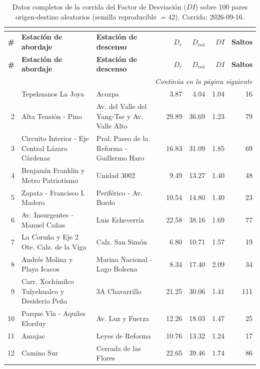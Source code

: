 {\scriptsize
\begin{longtable}{|r|p{5.0cm}|p{5.0cm}|r|r|r|r|}
\caption[Datos de corrida: Factor de Desviación (n=100, semilla=42)]{%
Datos completos de la corrida del Factor de Desviación ($DI$)
sobre 100 pares origen-destino aleatorios (semilla reproducible $= 42$).
Corrida: 2026-09-16.} \\
\label{tab:anx-di-corrida-completa} \\
\hline
\textbf{\#} & \textbf{Estación de abordaje} & \textbf{Estación de descenso} &
\textbf{$D_r$} & \textbf{$D_\text{red}$} &
\textbf{$DI$} & \textbf{Saltos} \\
\hline
\endfirsthead
\hline
\textbf{\#} & \textbf{Estación de abordaje} & \textbf{Estación de descenso} &
\textbf{$D_r$} & \textbf{$D_\text{red}$} &
\textbf{$DI$} & \textbf{Saltos} \\
\hline
\endhead
\hline \multicolumn{7}{r}{\small\textit{Continúa en la página siguiente}} \\
\endfoot
\hline
\endlastfoot
  1 & Tepehuanos La Joya & Acoxpa & 3.87 & 4.04 & 1.04 & 16 \\
  \hline
  2 & Alta Tensión - Pino & Av. del Valle del Yang-Tse y Av. Valle Alto & 29.89 & 36.69 & 1.23 & 79 \\
  \hline
  3 & Circuito Interior - Eje Central Lázaro Cárdenas & Prol. Paseo de la Reforma - Guillermo Haro & 16.83 & 31.09 & 1.85 & 69 \\
  \hline
  4 & Benjamín Franklin y Metro Patriotismo & Unidad 3002 & 9.49 & 13.27 & 1.40 & 48 \\
  \hline
  5 & Zapata - Francisco I. Madero & Periférico - Av. Bordo & 10.54 & 14.80 & 1.40 & 23 \\
  \hline
  6 & Av. Insurgentes - Manuel Cañas & Luis Echeverría & 22.58 & 38.16 & 1.69 & 77 \\
  \hline
  7 & La Coruña y Eje 2 Ote. Calz. de la Viga & Calz. San Simón & 6.80 & 10.71 & 1.57 & 19 \\
  \hline
  8 & Andrés Molina y Playa Icacos & Marina Nacional - Lago Bolsena & 8.34 & 17.40 & 2.09 & 34 \\
  \hline
  9 & Carr. Xochimilco Tulyehualco y Desiderio Peña & 3A Chavarrillo & 21.25 & 30.06 & 1.41 & 111 \\
  \hline
  10 & Parque Vía - Aquiles Elorduy & Av. Luz y Fuerza & 12.26 & 18.03 & 1.47 & 25 \\
  \hline
  11 & Amajac & Leyes de Reforma & 10.76 & 13.32 & 1.24 & 17 \\
  \hline
  12 & Camino Sur & Cerrada de las Flores & 22.65 & 39.46 & 1.74 & 86 \\

\end{longtable}}
